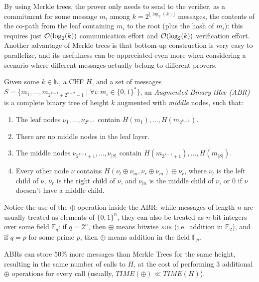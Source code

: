 \noindent By using Merkle trees, the prover only needs to send to the verifier, as a commitment for
some message \(m_i\) among \(k = 2^{\lfloor\log_2(k)\rfloor}\) messages, the contents of the
co-path from the leaf containing \(m_i\) to the root (plus the hash of \(m_i\)): this requires just
\(\mathcal{O}(\log_2(k))\) communication effort and \(\mathcal{O}(\log_2(k))\) verification effort.
Another advantage of Merkle trees is that bottom-up construction is very easy to parallelize,
and its usefulness can be appreciated even more when considering a scenario where different
messages actually belong to different provers.
\begin{definition}
	Given some \(k \in \mathbb{N}\), a CHF \(H\), and a set of messages
	\(S = \{m_1, \dots, m_{2^{k-1} + 2^{k-2}-1} \mid \forall i\colon m_i \in {\{0, 1\}}^*\} \),
	an \emph{Augmented Binary tRee (ABR)} is a complete binary tree of
	height \(k\) augmented with \emph{middle} nodes, such that:
	\begin{enumerate}
		\item The leaf nodes \(\nu_{1}, \dots, \nu_{2^{k-1}}\) contain \(H(m_1), \dots,
		      H(m_{2^{k-1}})\).
		\item There are no middle nodes in the leaf layer.
		\item The middle nodes \(\nu_{2^{k-1}+1}, \dots, \nu_{|S|}\) contain
		      \(H(m_{2^{k-1}+1}), \dots, H(m_{|S|})\).
		\item Every other node \(\nu \) contains \(H(\nu_l \oplus \nu_m, \nu_r \oplus \nu_m)
		      \oplus \nu_r \), where \(\nu_l\) is the left child of \(\nu \), \(\nu_r\) is the right
		      child of \(\nu \), and \(\nu_m\) is the middle child of \(\nu \), or
		      \(0\) if \(\nu \) doesen't have a middle child.
	\end{enumerate}
\end{definition}

\noindent Notice the use of the \(\oplus \) operation inside the ABR\@: while messages of length \(n\)
are usually treated as elements of \({\{0, 1\}}^n\), they can also be treated as \(n\)-bit integers
over some field \(\mathbb{F}_q\): if \(q = 2^n\), then \(\oplus \) means bitwise \textsc{xor}
(i.e.\ addition in \(\mathbb{F}_2\)), and if \(q = p\) for some prime \(p\), then
\(\oplus \) means addition in the field \(\mathbb{F}_p\).

ABRs can store 50\% more messages than Merkle Trees for the same height, resulting in the
same number of calls to \(H\), at the cost of performing 3 additional \(\oplus \) operations for
every call (usually, \(TIME(\oplus) \ll TIME(H)\)).
